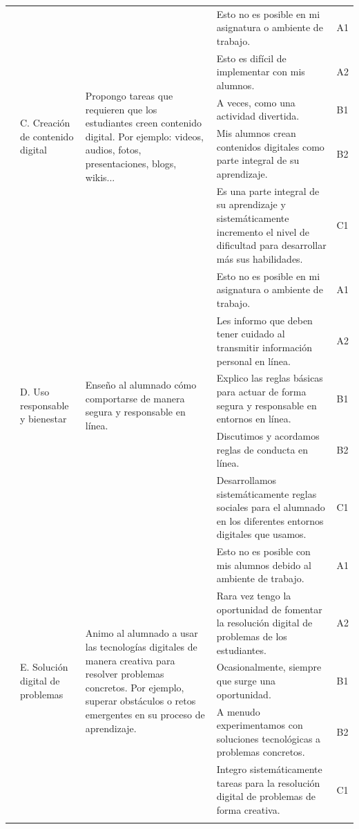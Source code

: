 \documentclass[spanish]{textolivre}
\begin{document}
\begin{small}
\begin{longtable}{
    >{\raggedright\arraybackslash}p{}
    p{}
    p{}
    p{}
    p{}
    }
\cmidrule{2-5}
& \multirow{5}{=}{C. Creación de contenido digital} & \multirow{5}{=}{Propongo tareas que requieren que los estudiantes creen contenido digital. Por ejemplo: videos, audios, fotos, presentaciones, blogs, wikis...} & Esto no es posible en mi asignatura o ambiente de trabajo. & A1
\\
& & & Esto es difícil de implementar con mis alumnos. & A2
\\
& & & A veces, como una actividad divertida. & B1
\\
& & & Mis alumnos crean contenidos digitales como parte integral de su aprendizaje. & B2
\\
& & & Es una parte integral de su aprendizaje y sistemáticamente incremento el nivel de dificultad para desarrollar más sus habilidades. & C1
\\
\cmidrule{2-5}
& \multirow{5}{=}{D. Uso responsable y bienestar} & \multirow{5}{=}{Enseño al alumnado cómo comportarse de manera segura y responsable en línea.} & Esto no es posible en mi asignatura o ambiente de trabajo. & A1
\\
& & & Les informo que deben tener cuidado al transmitir información personal en línea. & A2
\\
& & & Explico las reglas básicas para actuar de forma segura y responsable en entornos en línea. & B1
\\
& & & Discutimos y acordamos reglas de conducta en línea. & B2
\\
& & & Desarrollamos sistemáticamente reglas sociales para el alumnado en los diferentes entornos digitales que usamos. & C1
\\
\cmidrule{2-5}
& \multirow{5}{=}{E. Solución digital de problemas} & \multirow{5}{=}{Animo al alumnado a usar las tecnologías digitales de manera creativa para resolver problemas concretos. Por ejemplo, superar obstáculos o retos emergentes en su proceso de aprendizaje.} & Esto no es posible con mis alumnos debido al ambiente de trabajo. & A1
\\
& & & Rara vez tengo la oportunidad de fomentar la resolución digital de problemas de los estudiantes. & A2
\\
& & & Ocasionalmente, siempre que surge una oportunidad. & B1
\\
& & & A menudo experimentamos con soluciones tecnológicas a problemas concretos. & B2
\\
& & & Integro sistemáticamente tareas para la resolución digital de problemas de forma creativa. & C1
\\
\bottomrule
\source{\textcite{cabero-almenara2020}.}
\end{longtable}
\end{small}
\end{document}
